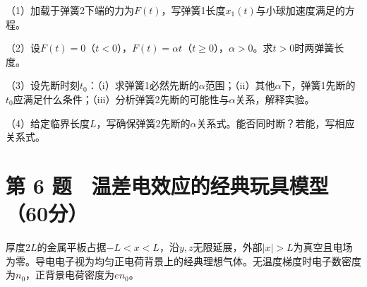 \documentclass[12pt,a4paper,fontset=fandol]{ctexart}
\begin{document}
\begin{center}
\begin{minipage}{\linewidth}
\centering\begingroup{}
\ifdim\wd\diagrambox>.88\linewidth
\sbox{\diagrambox}{\resizebox{.88\linewidth}{!}{\usebox{\diagrambox}}}\fi
\ifdim\ht\diagrambox>.20\textheight
\resizebox{!}{.20\textheight}{\usebox{\diagrambox}}
\else\usebox{\diagrambox}\fi
\par{}\endgroup\end{minipage}\end{center}

（1）加载于弹簧2下端的力为\(F(t)\)，写弹簧1长度\(x_1(t)\)与小球加速度满足的方程。

（2）设\(F(t)=0\)（\(t<0\)），\(F(t)=\alpha t\)（\(t\geq0\)），\(\alpha>0\)。求\(t>0\)时两弹簧长度。

（3）设先断时刻\(t_0\)：（i）求弹簧1必然先断的\(\alpha\)范围；（ii）其他\(\alpha\)下，弹簧1先断的\(t_0\)应满足什么条件；（iii）分析弹簧2先断的可能性与\(\alpha\)关系，解释实验。

（4）给定临界长度\(L\)，写确保弹簧2先断的\(\alpha\)关系式。能否同时断？若能，写相应关系式。

\clearpage

\section{第 6
题　温差电效应的经典玩具模型（60分）}\label{ux7b2c-6-ux9898-ux6e29ux5deeux7535ux6548ux5e94ux7684ux7ecfux5178ux73a9ux5177ux6a21ux578b60ux5206}

厚度\(2L\)的金属平板占据\(-L<x<L\)，沿\(y,z\)无限延展，外部\(|x|>L\)为真空且电场为零。导电电子视为均匀正电荷背景上的经典理想气体。无温度梯度时电子数密度为\(n_0\)，正背景电荷密度为\(en_0\)。
\end{document}
